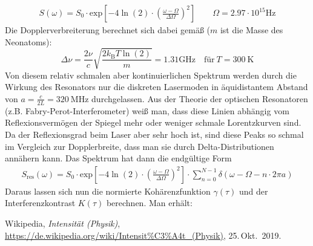 \documentclass[german,  %
parskip=full,  %
]{scrartcl}
\begin{document}
\begin{align}
S(\omega) = S_0\cdot\mathrm{exp}\left[-4\ln(2)\cdot\left(\frac{\omega - \Omega}{\Delta\Omega}\right)^2\right] \quad\quad \Omega = 2.97\cdot 10^{15}\mathrm{Hz} 
\end{align} 
Die Dopplerverbreiterung berechnet sich dabei gemäß (\(m\) ist die Masse des Neonatoms):
\[\Delta\nu = \frac{2\nu}{c}\sqrt{\frac{2 k_{\mathrm{B}} T \ln(2)}{m}} = 1.31 \mathrm{GHz} \quad\text{für} \ T = 300 \ \mathrm{K}\]
Von diesem relativ schmalen aber kontinuierlichen Spektrum werden durch die Wirkung des Resonators nur die diskreten Lasermoden in äquidistantem Abstand von \(a = \frac{c}{2L} = 320 \ \mathrm{MHz}\) durchgelassen. Aus der Theorie der optischen Resonatoren (z.B. Fabry-Perot-Interferometer) weiß man, dass diese Linien abhängig vom Reflexionsvermögen der Spiegel mehr oder weniger schmale Lorentzkurven sind. Da der Reflexionsgrad beim Laser aber sehr hoch ist, sind diese Peaks so schmal im Vergleich zur Dopplerbreite, dass man sie durch Delta-Distributionen annähern kann. Das Spektrum hat dann die endgültige Form
\begin{align*}
S_{\mathrm{res}}(\omega) =  S_0\cdot\mathrm{exp}\left[-4\ln(2)\cdot\left(\frac{\omega - \Omega}{\Delta\Omega}\right)^2\right] \cdot\sum_{n = 0}^{N-1} \delta(\omega - \Omega - n\cdot 2\pi a)
\end{align*} 
Daraus lassen sich nun die normierte Kohärenzfunktion \(\gamma(\tau)\) und der Interferenzkontrast \(K(\tau)\) berechnen. Man erhält:
    \begin{thebibliography}{9}
    Wikipedia,
    \emph{Intensität (Physik)},
    \url{https://de.wikipedia.org/wiki/Intensit%C3%A4t_(Physik)},
    25.\,Okt.~2019.
    \end{thebibliography}

\end{document}
